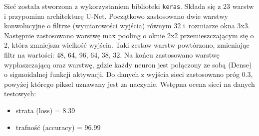 \documentclass[polish,polish,a4paper]{article}
\begin{document}
Sieć została stworzona z wykorzystaniem biblioteki \texttt{keras}.
Składa się z 23 warstw i przypomina architekturę U-Net. 
Początkowo zastosowano dwie warstwy konwolucyjne o filtrze (wymiarowości wyjścia) równym 32 i~rozmiarze okna 3x3.
Następnie zastosowano warstwę max pooling o oknie 2x2 przemieszczającym się o 2, która zmniejsza wielkość wyjścia.
Taki zestaw warstw powtórzono, zmieniając filtr na wartości: 48, 64, 96, 64, 38, 32.
Na końcu zastosowano warstwę wypłaszczającą oraz warstwę, gdzie każdy neuron jest połączony ze sobą (Dense) o sigmoidalnej funkcji aktywacji.
Do danych z wyjścia sieci zastosowano próg 0.3, powyżej którego piksel uznawany jest za naczynie.
Wstępna ocena sieci na danych testowych:
\begin{itemize}
    \item strata (loss) = 8.39%
    \item trafność (accuracy) = 96.99%
\end{itemize}
\end{document}

